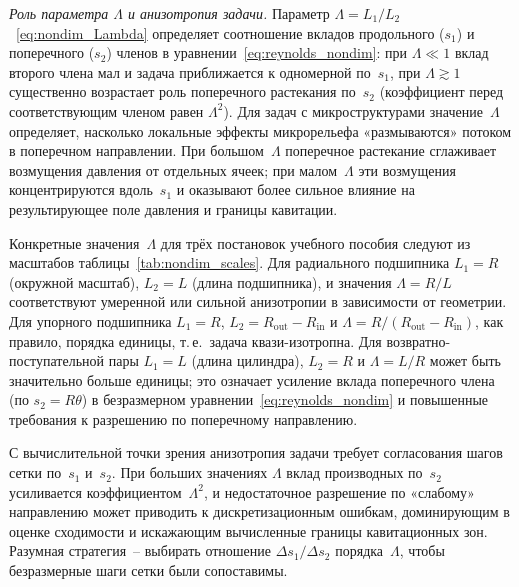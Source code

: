 \textit{Роль параметра $\Lambda$ и анизотропия задачи.}
Параметр
$\Lambda = L_1/L_2$~\eqref{eq:nondim_Lambda} определяет
соотношение вкладов продольного ($s_1$) и поперечного ($s_2$)
членов в уравнении~\eqref{eq:reynolds_nondim}:
при $\Lambda \ll 1$ вклад второго члена мал и задача
приближается к одномерной по~$s_1$, при $\Lambda \gtrsim 1$
существенно возрастает роль поперечного растекания по~$s_2$
(коэффициент перед соответствующим членом
равен $\Lambda^2$). Для задач с микроструктурами
значение~$\Lambda$ определяет, насколько локальные эффекты
микрорельефа «размываются» потоком в поперечном направлении.
При большом~$\Lambda$ поперечное растекание сглаживает
возмущения давления от отдельных ячеек; при малом~$\Lambda$
эти возмущения концентрируются вдоль~$s_1$ и оказывают более
сильное влияние на результирующее поле давления и границы
кавитации.

Конкретные значения~$\Lambda$ для трёх постановок учебного пособия
следуют из масштабов таблицы~\ref{tab:nondim_scales}.
Для радиального подшипника $L_1 = R$ (окружной масштаб),
$L_2 = L$ (длина подшипника), и значения $\Lambda = R/L$
соответствуют умеренной или сильной анизотропии в зависимости
от геометрии. Для упорного подшипника $L_1 = R$,
$L_2 = R_{\mathrm{out}} - R_{\mathrm{in}}$
и $\Lambda = R/(R_{\mathrm{out}} - R_{\mathrm{in}})$, как
правило, порядка единицы, т.\,е.\ задача квази-изотропна.
Для возвратно-поступательной пары $L_1 = L$ (длина
цилиндра), $L_2 = R$ и $\Lambda = L/R$ может быть значительно
больше единицы; это означает усиление вклада поперечного члена
(по $s_2 = R\theta$) в безразмерном
уравнении~\eqref{eq:reynolds_nondim} и повышенные требования
к разрешению по поперечному направлению.

С вычислительной точки зрения анизотропия задачи требует
согласования шагов сетки по~$s_1$ и~$s_2$. При больших
значениях $\Lambda$ вклад производных по~$s_2$ усиливается
коэффициентом~$\Lambda^2$, и недостаточное разрешение
по «слабому» направлению может приводить
к дискретизационным ошибкам, доминирующим в оценке сходимости
и искажающим вычисленные границы кавитационных зон. Разумная
стратегия~-- выбирать отношение
$\Delta s_1/\Delta s_2$ порядка~$\Lambda$, чтобы
безразмерные шаги сетки были сопоставимы.

